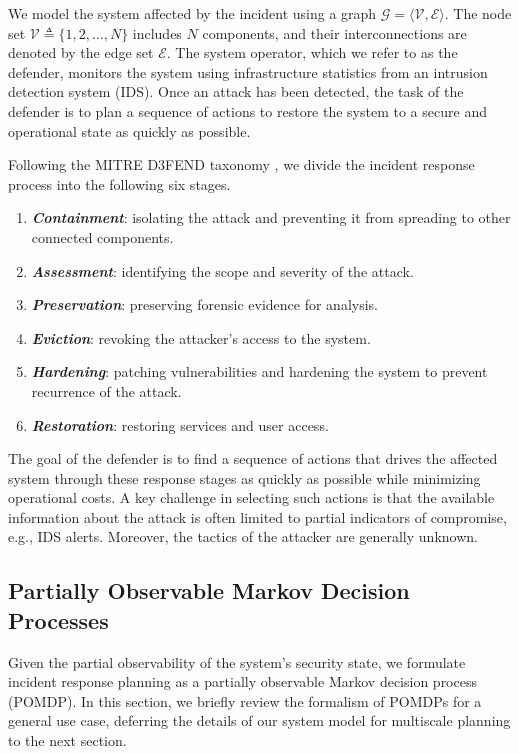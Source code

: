 \documentclass[sigconf]{acmart}
\begin{document}
We model the system affected by the incident using a graph $\mathcal{G}=\langle \mathcal{V}, \mathcal{E}\rangle$. The node set $\mathcal{V}\triangleq\{1, 2, \ldots, N\}$ includes $N$ components, and their interconnections are denoted by the edge set $\mathcal{E}$. The system operator, which we refer to as the defender, monitors the system using infrastructure statistics from an intrusion detection system (IDS). Once an attack has been detected, the task of the defender is to plan a sequence of actions to restore the system to a secure and operational state as quickly as possible.

Following the MITRE D3FEND taxonomy \cite{d3fend}, we divide the incident response process into the following six stages.
\begin{enumerate}[nosep]
    \item \textit{\textbf{Containment}}: isolating the attack and preventing it from spreading to other connected components.
    \item \textit{\textbf{Assessment}}: identifying the scope and severity of the attack.
    \item \textit{\textbf{Preservation}}: preserving forensic evidence for analysis.
    \item \textit{\textbf{Eviction}}: revoking the attacker's access to the system.
    \item \textit{\textbf{Hardening}}: patching vulnerabilities and hardening the system to prevent recurrence of the attack.
    \item \textit{\textbf{Restoration}}: restoring services and user access.
\end{enumerate}
The goal of the defender is to find a sequence of actions that drives the affected system through these response stages as quickly as possible while minimizing operational costs. A key challenge in selecting such actions is that the available information about the attack is often limited to partial indicators of compromise, e.g., IDS alerts. Moreover, the tactics of the attacker are generally unknown.
\subsection{Partially Observable Markov Decision Processes}\label{subsec:pomdp}
Given the partial observability of the system's security state, we formulate incident response planning as a partially observable Markov decision process (POMDP). In this section, we briefly review the formalism of POMDPs for a general use case, deferring the details of our system model for multiscale planning to the next section.    
\end{document}
